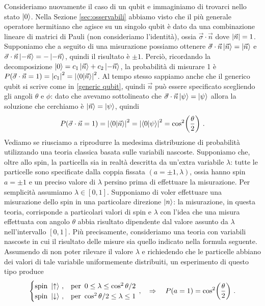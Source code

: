 \begin{esempio}
    Consideriamo nuovamente il caso di un qubit e immaginiamo di trovarci nello stato $\ket{0}$. Nella Sezione \ref{sec:osservabili} abbiamo visto che il più generale operatore hermitiano che agisce su un singolo qubit è dato da una combinazione lineare di matrici di Pauli (non consideriamo l'identità), ossia $\vec{\sigma} \cdot \vec{n}$ dove $\abs{\vec{n}} = 1$. Supponiamo che a seguito di una misurazione possiamo ottenere $\vec{\sigma} \cdot \vec{n} \ket{\vec{n}} = \ket{\vec{n}}$ e $\vec{\sigma} \cdot \vec{n} \ket{-\vec{n}} = - \ket{-\vec{n}}$, quindi il risultato è $\pm 1$. Perciò, ricordando la decomposizione $\ket{0} = c_1 \ket{\vec{n}} + c_2 \ket{-\vec{n}}$, la probabilità di misurare 1 è $P(\vec{\sigma} \cdot \vec{n} = 1) = \abs{c_1}^2 = \abs{\braket{0}{\vec{n}}}^2$. Al tempo stesso sappiamo anche che il generico qubit si scrive come in \eqref{generic qubit}, quindi $\vec{n}$ può essere specificato scegliendo gli angoli $\theta$ e $\phi$: dato che avevamo sottolineato che $\vec{\sigma} \cdot \vec{n} \ket{\psi} = \ket{\psi}$ allora la soluzione che cerchiamo è $\ket{\vec{n}} = \ket{\psi}$, quindi
    \begin{equation*}
        P(\vec{\sigma} \cdot \vec{n} = 1) = \abs{\braket{0}{\vec{n}}}^2 = \abs{\braket{0}{\psi}}^2 = \cos^2 \! \left( \frac{\theta}{2} \right) \, .
    \end{equation*}
    Vediamo se riusciamo a riprodurre la medesima distribuzione di probabilità utilizzando una teoria classica basata sulle variabili nascoste. Supponiamo che, oltre allo spin, la particella sia in realtà descritta da un'extra variabile $\lambda$: tutte le particelle sono specificate dalla coppia fissata $(a = \pm 1, \lambda)$, ossia hanno spin $a = \pm 1$ e un preciso valore di $\lambda$ persino prima di effettuare la misurazione. Per semplicità assumiamo $\lambda \in [0,1]$. Supponiamo di voler effettuare una misurazione dello spin in una particolare direzione $\ket{n}$: la misurazione, in questa teoria, corrisponde a particolari valori di spin e $\lambda$ con l'idea che una misura effettuata con angolo $\theta$ abbia risultato dipendente dal valore assunto da $\lambda$ nell'intervallo $[0,1]$. Più precisamente,  consideriamo una teoria con variabili nascoste in cui  il risultato delle misure sia quello indicato nella formula seguente. Assumendo di non poter rilevare il valore $\lambda$ e richiedendo che le particelle abbiano dei valori di tale variabile uniformemente distribuiti, un esperimento di questo tipo produce 
    \begin{equation*}
        \begin{cases}
            \text{spin }\ket{\uparrow} \, , & \text{per} \, \, \, 0 \leq \lambda \leq \cos^2 \theta/2 \\
            \text{spin }\ket{\downarrow} \, , &\text{per} \,\,  \cos^2 \theta/2 \leq \lambda \leq 1
        \end{cases} \, , \quad \Rightarrow \quad P(a = 1) = \cos^2 \! \left( \frac{\theta}{2} \right) \, .
    \end{equation*}
\end{esempio}

